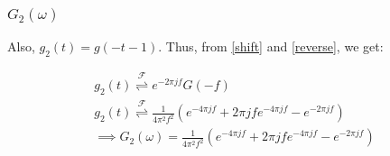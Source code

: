 \documentclass{beamer}
\providecommand{\fourier}{\overset{\mathcal{F}}{ \rightleftharpoons}}
\begin{document}
\begin{frame}
\begin{columns}
\begin{column}{0.5\textwidth}
\begin{figure}
\begin{flushleft}
\end{flushleft}
\end{figure}
\end{column}
\end{columns}
\end{frame}


\begin{frame}
    \frametitle{$G_2(\omega)$}
    \begin{flushleft}
    Also, $g_2(t) = g(-t-1)$. Thus, from \eqref{shift} and \eqref{reverse}, we get:

\begin{align}
   g_2(t) \fourier e^{-2\pi jf}G(-f) \\
   g_2(t) \fourier \frac{1}{4\pi^2f^2}(e^{-4\pi jf} + 2\pi jf e^{-4\pi jf} - e^{-2\pi jf})\\
   \implies G_2(\omega) = \frac{1}{4\pi^2f^2}(e^{-4\pi jf} + 2\pi jf e^{-4\pi jf} - e^{-2\pi jf})
\end{align}
  \end{flushleft}
\end{frame}
\end{document}
